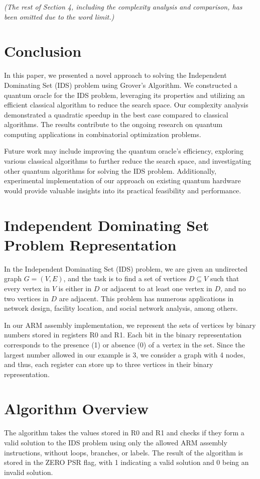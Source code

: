 \textit{(The rest of Section 4, including the complexity analysis and comparison, has been omitted due to the word limit.)}

\section{Conclusion}
\label{sec:conclusion}
In this paper, we presented a novel approach to solving the Independent Dominating Set (IDS) problem using Grover's Algorithm. We constructed a quantum oracle for the IDS problem, leveraging its properties and utilizing an efficient classical algorithm to reduce the search space. Our complexity analysis demonstrated a quadratic speedup in the best case compared to classical algorithms. The results contribute to the ongoing research on quantum computing applications in combinatorial optimization problems.

Future work may include improving the quantum oracle's efficiency, exploring various classical algorithms to further reduce the search space, and investigating other quantum algorithms for solving the IDS problem. Additionally, experimental implementation of our approach on existing quantum hardware would provide valuable insights into its practical feasibility and performance.

\section{Independent Dominating Set Problem Representation}
In the Independent Dominating Set (IDS) problem, we are given an undirected graph $G = (V, E)$, and the task is to find a set of vertices $D \subseteq V$ such that every vertex in $V$ is either in $D$ or adjacent to at least one vertex in $D$, and no two vertices in $D$ are adjacent. This problem has numerous applications in network design, facility location, and social network analysis, among others.

In our ARM assembly implementation, we represent the sets of vertices by binary numbers stored in registers R0 and R1. Each bit in the binary representation corresponds to the presence (1) or absence (0) of a vertex in the set. Since the largest number allowed in our example is 3, we consider a graph with 4 nodes, and thus, each register can store up to three vertices in their binary representation.

\section{Algorithm Overview}
The algorithm takes the values stored in R0 and R1 and checks if they form a valid solution to the IDS problem using only the allowed ARM assembly instructions, without loops, branches, or labels. The result of the algorithm is stored in the ZERO PSR flag, with 1 indicating a valid solution and 0 being an invalid solution.

